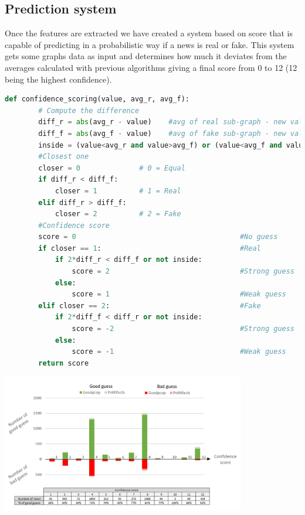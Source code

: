 \documentclass[11pt,a4paper]{article}
\begin{document}
\newpage

\subsection*{Prediction system}

Once the features are extracted we have created a system based on score that is capable of predicting in a probabilistic way if a news is real or fake. This system gets some graphs data as input
and determines how much it deviates from the averages calculated with previous algorithms giving a final score from 0 to 12 (12 being the highest confidence).

\begin{lstlisting}[language=Python]
	def confidence_scoring(value, avg_r, avg_f):
        # Compute the difference
        diff_r = abs(avg_r - value)    #avg of real sub-graph - new value
        diff_f = abs(avg_f - value)    #avg of fake sub-graph - new value
        inside = (value<avg_r and value>avg_f) or (value<avg_f and value>avg_r) #The value is between the 2 avg
        #Closest one
        closer = 0              # 0 = Equal
        if diff_r < diff_f:
            closer = 1          # 1 = Real
        elif diff_r > diff_f:
            closer = 2          # 2 = Fake
        #Confidence score
        score = 0                                       #No guess
        if closer == 1:                                 #Real
            if 2*diff_r < diff_f or not inside:
                score = 2                               #Strong guess
            else:
                score = 1                               #Weak guess
        elif closer == 2:                               #Fake
            if 2*diff_f < diff_r or not inside:
                score = -2                              #Strong guess
            else:
                score = -1                              #Weak guess
        return score
\end{lstlisting}

\begin{center}
	\includegraphics[width=0.8\textwidth]{graph}
\end{center}
\end{document}

